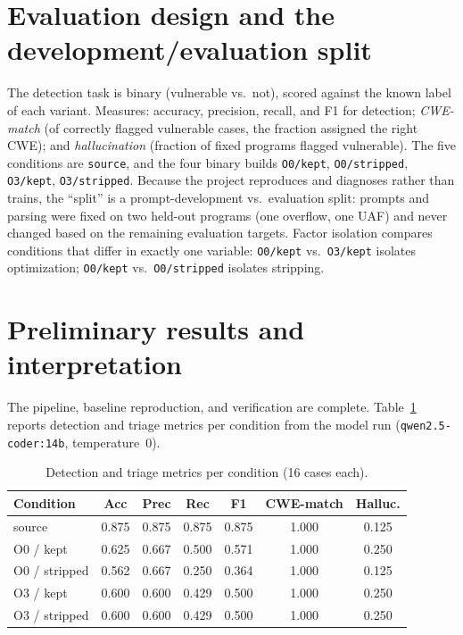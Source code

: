 \documentclass[10pt]{article}
\begin{document}
\section{Evaluation design and the development/evaluation split}
The detection task is binary (vulnerable vs.\ not), scored against the known
label of each variant. Measures: accuracy, precision, recall, and F1 for
detection; \emph{CWE-match} (of correctly flagged vulnerable cases, the fraction
assigned the right CWE); and \emph{hallucination} (fraction of fixed programs
flagged vulnerable). The five conditions are \texttt{source}, and the four binary
builds \texttt{O0/kept}, \texttt{O0/stripped}, \texttt{O3/kept},
\texttt{O3/stripped}. Because the project reproduces and diagnoses rather than
trains, the ``split'' is a prompt-development vs.\ evaluation split: prompts and
parsing were fixed on two held-out programs (one overflow, one UAF)
and never changed based on the remaining evaluation targets. Factor isolation
compares conditions that differ in exactly one variable: \texttt{O0/kept} vs.\
\texttt{O3/kept} isolates optimization; \texttt{O0/kept} vs.\ \texttt{O0/stripped}
isolates stripping.

\section{Preliminary results and interpretation}
The pipeline, baseline reproduction, and verification are complete.
Table~\ref{tab:results} reports detection and triage metrics per condition from
the model run (\texttt{qwen2.5-coder:14b}, temperature~0).

\begin{table}[h]
\centering
\small
\begin{tabular}{lcccccc}
\toprule
Condition & Acc & Prec & Rec & F1 & CWE-match & Halluc. \\
\midrule
source & 0.875 & 0.875 & 0.875 & 0.875 & 1.000 & 0.125 \\
O0 / kept & 0.625 & 0.667 & 0.500 & 0.571 & 1.000 & 0.250 \\
O0 / stripped & 0.562 & 0.667 & 0.250 & 0.364 & 1.000 & 0.125 \\
O3 / kept & 0.600 & 0.600 & 0.429 & 0.500 & 1.000 & 0.250 \\
O3 / stripped & 0.600 & 0.600 & 0.429 & 0.500 & 1.000 & 0.250 \\
\bottomrule
\end{tabular}
\caption{Detection and triage metrics per condition (16 cases each).}
\label{tab:results}
\end{table}
\end{document}
